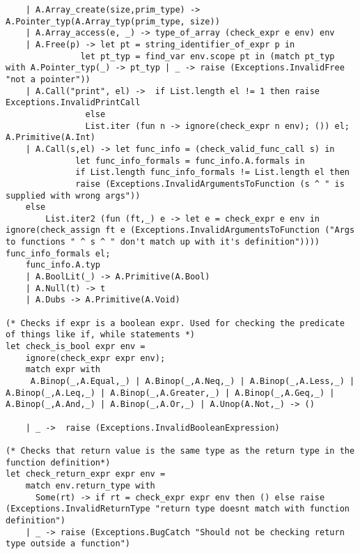 \documentclass{article}
\begin{document}
\begin{lstlisting}
	| A.Array_create(size,prim_type) -> A.Pointer_typ(A.Array_typ(prim_type, size))
	| A.Array_access(e, _) -> type_of_array (check_expr e env) env
	| A.Free(p) -> let pt = string_identifier_of_expr p in 
		       let pt_typ = find_var env.scope pt in (match pt_typ with A.Pointer_typ(_) -> pt_typ | _ -> raise (Exceptions.InvalidFree "not a pointer"))
	| A.Call("print", el) ->  if List.length el != 1 then raise Exceptions.InvalidPrintCall 
				else
				List.iter (fun n -> ignore(check_expr n env); ()) el; A.Primitive(A.Int)
	| A.Call(s,el) -> let func_info = (check_valid_func_call s) in
			  let func_info_formals = func_info.A.formals in
			  if List.length func_info_formals != List.length el then
			  raise (Exceptions.InvalidArgumentsToFunction (s ^ " is supplied with wrong args"))
	else
		List.iter2 (fun (ft,_) e -> let e = check_expr e env in ignore(check_assign ft e (Exceptions.InvalidArgumentsToFunction ("Args to functions " ^ s ^ " don't match up with it's definition")))) func_info_formals el;
	func_info.A.typ
	| A.BoolLit(_) -> A.Primitive(A.Bool)
	| A.Null(t) -> t
	| A.Dubs -> A.Primitive(A.Void)

(* Checks if expr is a boolean expr. Used for checking the predicate of things like if, while statements *)
let check_is_bool expr env = 
	ignore(check_expr expr env);
	match expr with
	 A.Binop(_,A.Equal,_) | A.Binop(_,A.Neq,_) | A.Binop(_,A.Less,_) | A.Binop(_,A.Leq,_) | A.Binop(_,A.Greater,_) | A.Binop(_,A.Geq,_) | A.Binop(_,A.And,_) | A.Binop(_,A.Or,_) | A.Unop(A.Not,_) -> ()

	| _ ->  raise (Exceptions.InvalidBooleanExpression)

(* Checks that return value is the same type as the return type in the function definition*)
let check_return_expr expr env = 
	match env.return_type with
	  Some(rt) -> if rt = check_expr expr env then () else raise (Exceptions.InvalidReturnType "return type doesnt match with function definition")
	| _ -> raise (Exceptions.BugCatch "Should not be checking return type outside a function")


\end{lstlisting}
\end{document}
